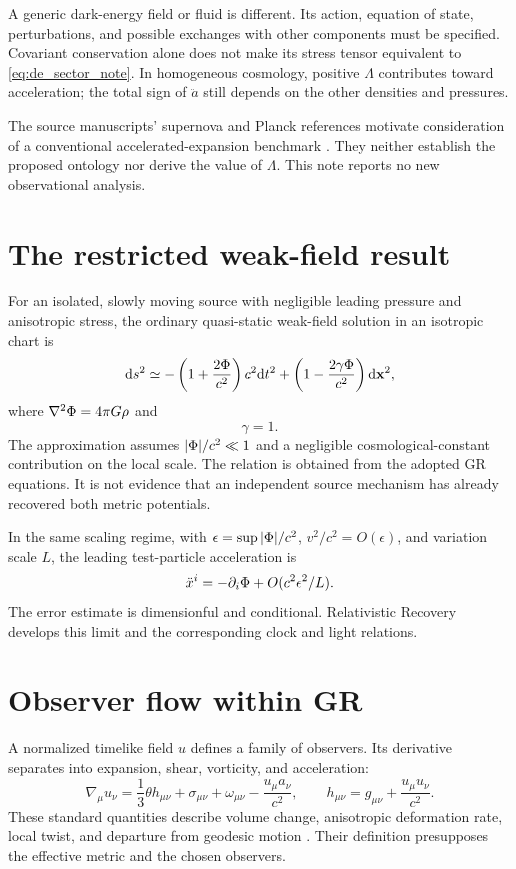 \documentclass[11pt]{article}
\begin{document}
A generic dark-energy field or fluid is different. Its action, equation of state, perturbations, and possible exchanges with other components must be specified. Covariant conservation alone does not make its stress tensor equivalent to \eqref{eq:de_sector_note}. In homogeneous cosmology, positive $\Lambda$ contributes toward acceleration; the total sign of $\ddot a$ still depends on the other densities and pressures.

The source manuscripts' supernova and Planck references motivate consideration of a conventional accelerated-expansion benchmark \parencite{Riess1998,Perlmutter1999,Planck2018Parameters}. They neither establish the proposed ontology nor derive the value of $\Lambda$. This note reports no new observational analysis.

\section{The restricted weak-field result}
For an isolated, slowly moving source with negligible leading pressure and anisotropic stress, the ordinary quasi-static weak-field solution in an isotropic chart is
\begin{equation}
\mathrm d s^2\simeq-\left(1+\frac{2\Phi}{c^2}\right)c^2\mathrm d t^2+
\left(1-\frac{2\gamma\Phi}{c^2}\right)\mathrm d\mathbf x^2,
\label{eq:weakfield}
\end{equation}
where $\nabla^2\Phi=4\pi G\rho$ and
\begin{equation}
\gamma=1.
\label{eq:gamma}
\end{equation}
The approximation assumes $|\Phi|/c^2\ll1$ and a negligible cosmological-constant contribution on the local scale. The relation is obtained from the adopted GR equations. It is not evidence that an independent source mechanism has already recovered both metric potentials.

In the same scaling regime, with $\epsilon=\sup|\Phi|/c^2$, $v^2/c^2=O(\epsilon)$, and variation scale $L$, the leading test-particle acceleration is
\begin{equation}
\ddot x^i=-\partial_i\Phi+O(c^2\epsilon^2/L).
\end{equation}
The error estimate is dimensionful and conditional. Relativistic Recovery develops this limit and the corresponding clock and light relations.

\section{Observer flow within GR}
A normalized timelike field $u$ defines a family of observers. Its derivative separates into expansion, shear, vorticity, and acceleration:
\begin{equation}
\nabla_\mu u_\nu=\frac13\theta h_{\mu\nu}+\sigma_{\mu\nu}
+\omega_{\mu\nu}-\frac{u_\mu a_\nu}{c^2},\qquad
h_{\mu\nu}=g_{\mu\nu}+\frac{u_\mu u_\nu}{c^2}.
\end{equation}
These standard quantities describe volume change, anisotropic deformation rate, local twist, and departure from geodesic motion \parencite{EllisVanElst1999}. Their definition presupposes the effective metric and the chosen observers.
\end{document}
